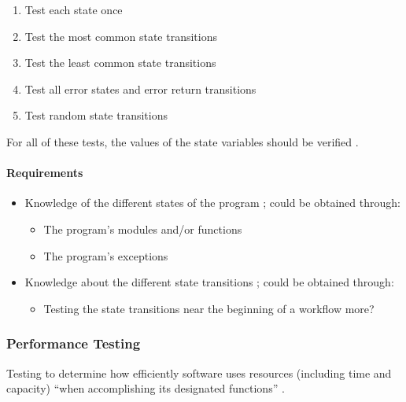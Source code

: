 \begin{enumerate}
      \item Test each state once
      \item Test the most common state transitions
      \item Test the least common state transitions
      \item Test all error states and error return transitions
      \item Test random state transitions
            \citep[pp.~82-83]{Patton2006}
\end{enumerate}

For all of these tests, the values of the state variables should be verified
\citep[p.~83]{Patton2006}.

\paragraph{Requirements}
\begin{itemize}
      \item Knowledge of the different states of the program
            \citep[p.~82]{Patton2006}; could be obtained through:
            \begin{itemize}
                  \item The program's modules and/or functions
                  \item The program's exceptions
            \end{itemize}
      \item Knowledge about the different state transitions
            \citep[p.~82]{Patton2006}; could be obtained through:
            \begin{itemize}
                  \item Testing the state transitions near the beginning of a
                        workflow more?
            \end{itemize}
\end{itemize}

\subsubsection{Performance Testing}

Testing to determine how efficiently software uses resources (including time
and capacity) ``when accomplishing its designated functions''
\citepISTQB{}. 


